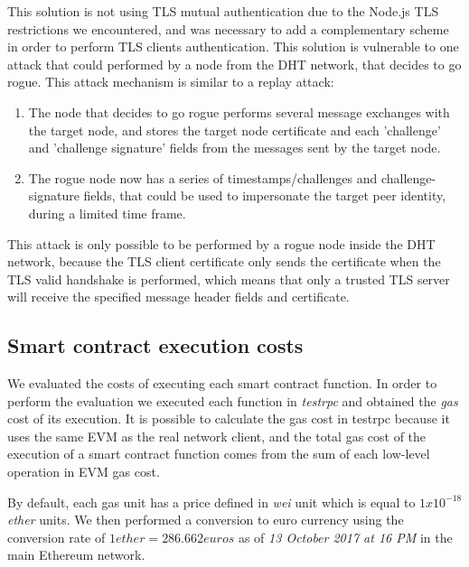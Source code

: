 This solution is not using TLS mutual authentication due to the Node.js TLS restrictions we encountered, and was necessary to add a complementary scheme in order to perform TLS clients authentication.
This solution is vulnerable to one attack that could performed by a node from the DHT network, that decides to go rogue.
This attack mechanism is similar to a replay attack:

\begin{enumerate}
  \item The node that decides to go rogue performs several message exchanges with the target node, and stores the target node certificate and each 'challenge' and 'challenge signature' fields from the messages sent by the target node.
  \item The rogue node now has a series of timestamps/challenges and challenge-signature fields, that could be used to impersonate the target peer identity, during a limited time frame.
\end{enumerate}

This attack is only possible to be performed by a rogue node inside the DHT network, because the TLS client certificate only sends the certificate when the TLS valid handshake is performed, which means that only a trusted TLS server will receive the specified message header fields and certificate.


\subsection{Smart contract execution costs}
\label{section:smart-contract-tests}

We evaluated the costs of executing each smart contract function.
In order to perform the evaluation we executed each function in \textit{testrpc} and obtained the \textit{gas} cost of its execution.
It is possible to calculate the gas cost in testrpc because it uses the same \ac{EVM} as the real network client, and the total gas cost of the execution of a smart contract function  comes from the sum of each low-level operation in EVM gas cost.

By default, each gas unit has a price defined in \textit{wei} unit which is equal to $1 x 10^{-18}$ \textit{ether} units.
We then performed a conversion to euro currency using the conversion rate of $1 ether = 286.662 euros$ as of \textit{13 October 2017 at 16 PM} in the main Ethereum network.

